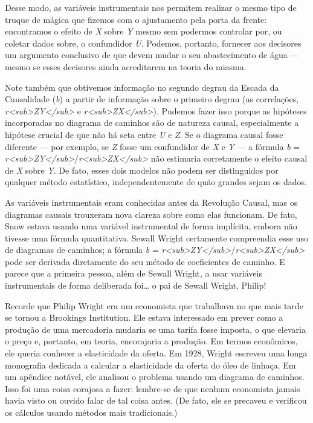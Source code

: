 \documentclass[11pt,a5paper,twoside]{book}
\begin{document}
Desse modo, as variáveis instrumentais nos permitem realizar o mesmo tipo de truque de mágica que fizemos com o ajustamento pela porta da frente: encontramos o efeito de \textit{X} sobre \textit{Y} mesmo sem podermos controlar por, ou coletar dados sobre, o confundidor \textit{U}. Podemos, portanto, fornecer aos decisores um argumento conclusivo de que devem mudar o seu abastecimento de água — mesmo se esses decisores ainda acreditarem na teoria do miasma.

Note também que obtivemos informação no segundo degrau da Escada da Causalidade (\textit{b}) a partir de informação sobre o primeiro degrau (as correlações, \textit{r<sub>ZY</sub>} e \textit{r<sub>ZX</sub>}). Pudemos fazer isso porque as hipóteses incorporadas no diagrama de caminhos são de natureza causal, especialmente a hipótese crucial de que não há seta entre \textit{U} e \textit{Z}. Se o diagrama causal fosse diferente — por exemplo, se \textit{Z} fosse um confundidor de \textit{X} e \textit{Y} — a fórmula \textit{b} = \textit{r<sub>ZY</sub>}/\textit{r<sub>ZX</sub>} não estimaria corretamente o efeito causal de \textit{X} sobre \textit{Y}. De fato, esses dois modelos não podem ser distinguidos por qualquer método estatístico, independentemente de quão grandes sejam os dados.

As variáveis instrumentais eram conhecidas antes da Revolução Causal, mas os diagramas causais trouxeram nova clareza sobre como elas funcionam. De fato, Snow estava usando uma variável instrumental de forma implícita, embora não tivesse uma fórmula quantitativa. Sewall Wright certamente compreendia esse uso de diagramas de caminhos; a fórmula \textit{b} = \textit{r<sub>ZY</sub>}/\textit{r<sub>ZX</sub>} pode ser derivada diretamente do seu método de coeficientes de caminho. E parece que a primeira pessoa, além de Sewall Wright, a usar variáveis instrumentais de forma deliberada foi… o pai de Sewall Wright, Philip!

Recorde que Philip Wright era um economista que trabalhava no que mais tarde se tornou a Brookings Institution. Ele estava interessado em prever como a produção de uma mercadoria mudaria se uma tarifa fosse imposta, o que elevaria o preço e, portanto, em teoria, encorajaria a produção. Em termos econômicos, ele queria conhecer a elasticidade da oferta. Em 1928, Wright escreveu uma longa monografia dedicada a calcular a elasticidade da oferta do óleo de linhaça. Em um apêndice notável, ele analisou o problema usando um diagrama de caminhos. Isso foi uma coisa corajosa a fazer: lembre-se de que nenhum economista jamais havia visto ou ouvido falar de tal coisa antes. (De fato, ele se precaveu e verificou os cálculos usando métodos mais tradicionais.)
\end{document}
